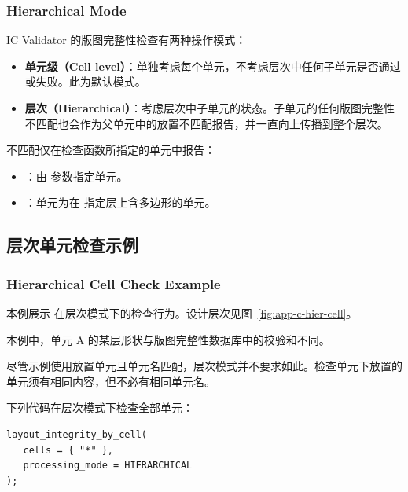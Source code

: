 \subsubsection*{Hierarchical Mode}

IC Validator 的版图完整性检查有两种操作模式：
\begin{itemize}
  \item \textbf{单元级（Cell level）}：单独考虑每个单元，不考虑层次中任何子单元是否通过或失败。此为默认模式。
  \item \textbf{层次（Hierarchical）}：考虑层次中子单元的状态。子单元的任何版图完整性不匹配也会作为父单元中的放置不匹配报告，并一直向上传播到整个层次。
\end{itemize}

不匹配仅在检查函数所指定的单元中报告：
\begin{itemize}
  \item {}：由  参数指定单元。
  \item {}：单元为在  指定层上含多边形的单元。
\end{itemize}

\subsection{层次单元检查示例}
\subsubsection*{Hierarchical Cell Check Example}

本例展示  在层次模式下的检查行为。设计层次见图~\ref{fig:app-c-hier-cell}。


本例中，单元 A 的某层形状与版图完整性数据库中的校验和不同。

\begin{noteBox}
尽管示例使用放置单元且单元名匹配，层次模式并不要求如此。检查单元下放置的单元须有相同内容，但不必有相同单元名。
\end{noteBox}

下列代码在层次模式下检查全部单元：

\begin{lstlisting}[style=pxl]
layout_integrity_by_cell(
   cells = { "*" },
   processing_mode = HIERARCHICAL
);
\end{lstlisting}

